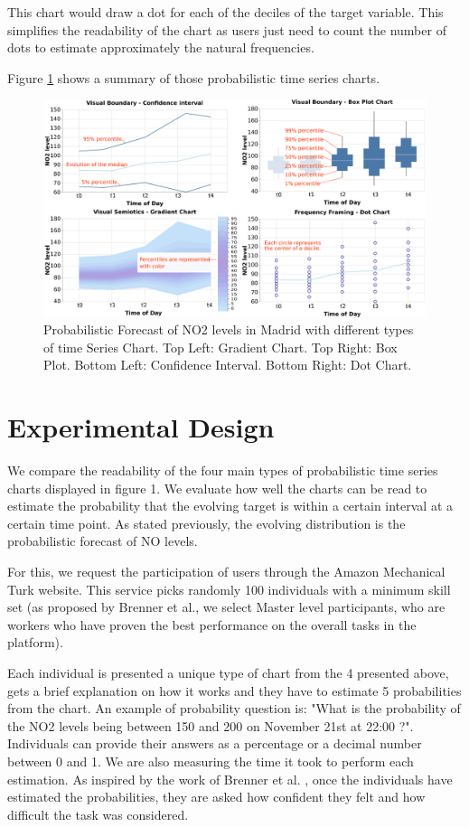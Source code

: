 \documentclass[a4paper,3p,sort&compress]{elsarticle}
\begin{document}
This chart would draw a dot for each of the deciles of the target variable. This simplifies the 
readability of the chart as users just need to count the number of dots to estimate approximately 
the natural frequencies.

Figure \ref{figure:charts} shows a summary of those probabilistic time series charts.

\begin{figure}
  \centering
  \includegraphics[width=.8\textwidth]{charts_vector} 
  \caption{\label{figure:charts} Probabilistic Forecast of NO2 levels in Madrid with different types of time Series Chart. 
  Top Left: Gradient Chart. Top Right: Box Plot. 
  Bottom Left: Confidence Interval. Bottom Right: Dot Chart.  }
\end{figure}

\section{Experimental Design}
\label{sec:exp_design}

We compare the readability of the four main types of probabilistic time series charts 
displayed in figure 1. We evaluate how well the charts can be read to estimate the probability 
that the evolving target is within a certain interval at a certain time point. As stated previously, 
the evolving distribution is the probabilistic forecast of NO levels. 

For this, we request the participation of users through the Amazon Mechanical Turk website. 
This service picks randomly 100 individuals with a minimum skill set (as proposed by Brenner 
et al., we select Master level participants, who are workers who have proven the best performance 
on the overall tasks in the platform).

Each individual is presented a unique type of chart from the 4 presented above, gets a brief 
explanation on how it works and they have to estimate 5 probabilities from the chart. An example of
probability question is: "What is the probability of the NO2 levels being between 150 and 200 on 
November 21st at 22:00 ?". Individuals can provide their answers as a percentage or a 
decimal number between 0
and 1. We are also measuring the time it took to perform each estimation. 
As inspired by the work of Brenner et 
al. , once the individuals have estimated the probabilities, they are asked how confident they 
felt and how difficult the task was considered.
\end{document}
